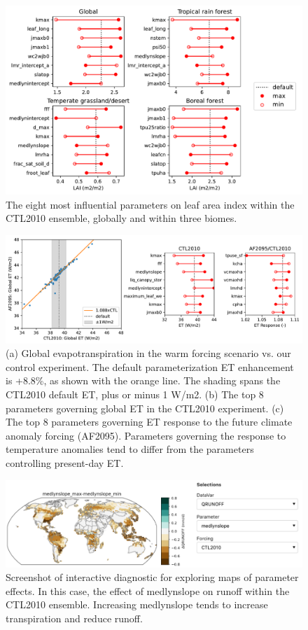 \documentclass[draft]{agujournal2019}
\begin{document}
\begin{figure}[h]
\centering
\includegraphics[width=40pc]{../figs/lai_biome.pdf}
\caption{The eight most influential parameters on leaf area index within the CTL2010 ensemble, globally and within three biomes.}
\label{fig:lai}
\end{figure}

\begin{figure}[h]
\centering
\includegraphics[width=40pc]{../figs/ET_response.pdf}
\caption{(a) Global evapotranspiration in the warm forcing scenario vs. our control experiment. The default parameterization ET enhancement is +8.8\%, as shown with the orange line. The shading spans the CTL2010 default ET, plus or minus 1 W/m2.
(b) The top 8 parameters governing global ET in the CTL2010 experiment.
(c) The top 8 parameters governing ET response to the future climate anomaly forcing (AF2095).
Parameters governing the response to temperature anomalies tend to differ from the parameters controlling present-day ET.}
\label{fig:et}
\end{figure}


\begin{figure}[h]
\centering
\includegraphics[width=40pc]{../figs/deltmap_panel.pdf}
\caption{Screenshot of interactive diagnostic for exploring maps of parameter effects. In this case, the effect of medlynslope on runoff within the CTL2010 ensemble. Increasing medlynslope tends to increase transpiration and reduce runoff.}
\label{fig:panel}
\end{figure}
\end{document}
